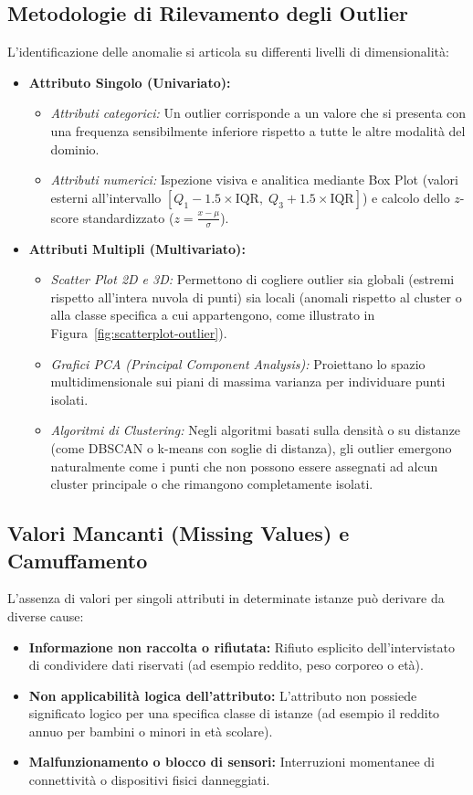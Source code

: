 \subsection{Metodologie di Rilevamento degli Outlier}
L'identificazione delle anomalie si articola su differenti livelli di dimensionalit\`a:
\begin{itemize}
    \item \textbf{Attributo Singolo (Univariato):}
    \begin{itemize}
        \item \textit{Attributi categorici:} Un outlier corrisponde a un valore che si presenta con una frequenza sensibilmente inferiore rispetto a tutte le altre modalit\`a del dominio.
        \item \textit{Attributi numerici:} Ispezione visiva e analitica mediante Box Plot (valori esterni all'intervallo $[Q_1 - 1.5 \times \text{IQR}, \; Q_3 + 1.5 \times \text{IQR}]$) e calcolo dello $z$-score standardizzato ($z = \frac{x - \mu}{\sigma}$).
    \end{itemize}
    \item \textbf{Attributi Multipli (Multivariato):}
    \begin{itemize}
        \item \textit{Scatter Plot 2D e 3D:} Permettono di cogliere outlier sia globali (estremi rispetto all'intera nuvola di punti) sia locali (anomali rispetto al cluster o alla classe specifica a cui appartengono, come illustrato in Figura~\ref{fig:scatterplot-outlier}).
        \item \textit{Grafici PCA (\textit{Principal Component Analysis}):} Proiettano lo spazio multidimensionale sui piani di massima varianza per individuare punti isolati.
        \item \textit{Algoritmi di Clustering:} Negli algoritmi basati sulla densit\`a o su distanze (come DBSCAN o k-means con soglie di distanza), gli outlier emergono naturalmente come i punti che non possono essere assegnati ad alcun cluster principale o che rimangono completamente isolati.
    \end{itemize}
\end{itemize}

\subsection{Valori Mancanti (Missing Values) e Camuffamento}
L'assenza di valori per singoli attributi in determinate istanze pu\`o derivare da diverse cause:
\begin{itemize}
    \item \textbf{Informazione non raccolta o rifiutata:} Rifiuto esplicito dell'intervistato di condividere dati riservati (ad esempio reddito, peso corporeo o et\`a).
    \item \textbf{Non applicabilit\`a logica dell'attributo:} L'attributo non possiede significato logico per una specifica classe di istanze (ad esempio il reddito annuo per bambini o minori in et\`a scolare).
    \item \textbf{Malfunzionamento o blocco di sensori:} Interruzioni momentanee di connettivit\`a o dispositivi fisici danneggiati.
\end{itemize}

